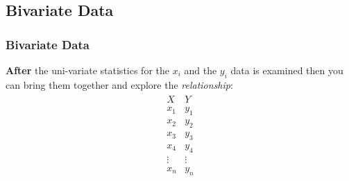 \subsection{Bivariate Data}


\begin{frame}
  \frametitle{Bivariate Data}

  \textbf{After} the uni-variate statistics for the $x_i$ and the
  $y_i$ data is examined then you can bring them together and explore
  the \textit{relationship}:
  \begin{eqnarray*}
    \begin{array}{l|l}
      X & Y \\ \hline
      x_1 & y_1 \\
      x_2 & y_2 \\
      x_3 & y_3 \\
      x_4 & y_4 \\
      \vdots & \vdots \\
      x_n & y_n
  \end{array}
\end{eqnarray*}

\end{frame}

